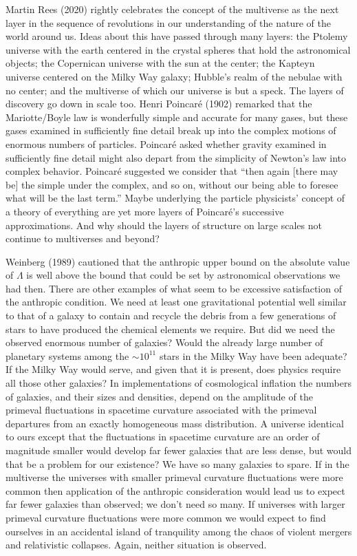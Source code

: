 \documentclass[fleqn,12pt]{article}
\begin{document}
Martin Rees (2020) rightly celebrates the concept of the multiverse as the next layer in the sequence of revolutions in our understanding of the nature of the world around us. Ideas about this have passed through many layers: the Ptolemy universe with the earth centered in the crystal spheres that hold the astronomical objects; the Copernican universe with the sun at the center; the Kapteyn universe centered on the Milky Way galaxy; Hubble's realm of the nebulae with no center; and the multiverse of which our universe is but a speck. The layers of discovery go down in scale too. Henri Poincar\'e (1902) remarked that the Mariotte/Boyle law is wonderfully simple and accurate for many gases, but these gases examined in sufficiently fine detail break up into the complex motions of enormous numbers of particles. Poincar\'e asked whether gravity examined in sufficiently fine detail might also depart from the simplicity of Newton's law into complex behavior. Poincar\'e suggested we consider that ``then again [there may be] the simple under the complex, and so on, without our being able to foresee what will be the last term.'' Maybe underlying the particle physicists' concept of a theory of everything are yet more layers of Poincar\'e's successive approximations. And why should the layers of structure on large scales not continue to multiverses and beyond? 

 Weinberg (1989) cautioned that the anthropic upper bound on the absolute value of $\Lambda$ is well above the bound that could be set by astronomical observations we had then. There are other examples of what seem to be excessive satisfaction of the anthropic condition. We need at least one gravitational potential well similar to that of a galaxy to contain and recycle the debris from a few generations of stars to have produced the chemical elements we require. But did we need the observed enormous number of galaxies? Would the already large number of planetary systems among the $\sim 10^{11}$ stars in the Milky Way have been adequate? If the Milky Way would serve, and given that it is present, does physics require all those other galaxies? In implementations of cosmological inflation the numbers of galaxies, and their sizes and densities, depend on the amplitude of the primeval fluctuations in spacetime curvature associated with the primeval departures from an exactly homogeneous mass distribution. A universe identical to ours except that the fluctuations in spacetime curvature are an order of magnitude smaller would develop far fewer galaxies that are less dense, but would that be a problem for our existence? We have so many galaxies to spare. If in the multiverse the universes with smaller primeval curvature fluctuations were more common then application of the anthropic consideration would lead us to expect far fewer galaxies than observed; we don't need so many. If universes with larger primeval curvature fluctuations were more common we would expect to find ourselves in an accidental island of tranquility among the chaos of violent mergers and relativistic collapses. Again, neither situation is observed.
\end{document}
